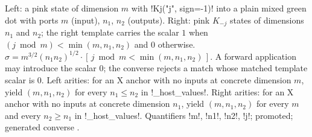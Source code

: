 Left: a pink state of dimension $m$ with \py!Kj("j", sign=-1)! into a plain mixed green dot with
ports $m$ (input), $n_1$, $n_2$ (outputs). Right: pink $K_{-j}$ states of dimensions $n_1$ and
$n_2$; the right template carries the scalar $1$ when $(j\bmod m)<\min(m,n_1,n_2)$ and $0$
otherwise. $\sigma=m^{3/2}(n_1n_2)^{1/2}\cdot[\,j\bmod m<\min(m,n_1,n_2)\,]$. A forward
application may introduce the scalar $0$; the converse rejects a match whose matched template
scalar is $0$. Left arities: for an X anchor with no inputs at concrete dimension $m$, yield
$(m,n_1,n_2)$ for every $n_1\le n_2$ in \py!_host_values!. Right arities: for an X anchor with no
inputs at concrete dimension $n_1$, yield $(m,n_1,n_2)$ for every $m$ and every $n_2\ge n_1$ in
\py!_host_values!. Quantifiers \code!m!, \code!n1!, \code!n2!, \code!j!; promoted; generated
converse .

